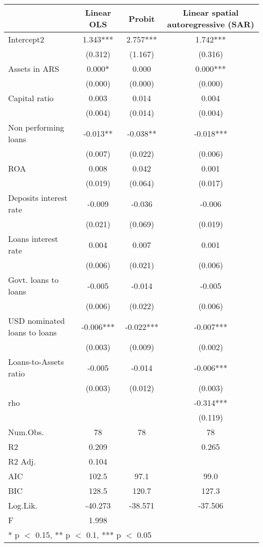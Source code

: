 \begin{table}
\centering
\begin{tabular}[t]{lccc}
\toprule
                             & Linear OLS & Probit & Linear spatial autoregressive (SAR)\\
\midrule
Intercept2                   & 1.343*** & 2.757*** & 1.742***\\
                             & (0.312) & (1.167) & (0.316)\\
Assets in ARS                & 0.000* & 0.000 & 0.000***\\
                             & (0.000) & (0.000) & (0.000)\\
Capital ratio                & 0.003 & 0.014 & 0.004\\
                             & (0.004) & (0.014) & (0.004)\\
Non performing loans         & -0.013** & -0.038** & -0.018***\\
                             & (0.007) & (0.022) & (0.006)\\
ROA                          & 0.008 & 0.042 & 0.001\\
                             & (0.019) & (0.064) & (0.017)\\
Deposits interest rate       & -0.009 & -0.036 & -0.006\\
                             & (0.021) & (0.069) & (0.019)\\
Loans interest rate          & 0.004 & 0.007 & 0.001\\
                             & (0.006) & (0.021) & (0.006)\\
Govt. loans to loans         & -0.005 & -0.014 & -0.005\\
                             & (0.006) & (0.022) & (0.006)\\
USD nominated loans to loans & -0.006*** & -0.022*** & -0.007***\\
                             & (0.003) & (0.009) & (0.002)\\
Loans-to-Assets ratio        & -0.005 & -0.014 & -0.006***\\
                             & (0.003) & (0.012) & (0.003)\\
rho                          &  &  & -0.314***\\
                             &  &  & (0.119)\\
\midrule
Num.Obs.                     & 78 & 78 & 78\\
R2                           & 0.209 &  & 0.265\\
R2 Adj.                      & 0.104 &  & \\
AIC                          & 102.5 & 97.1 & 99.0\\
BIC                          & 128.5 & 120.7 & 127.3\\
Log.Lik.                     & -40.273 & -38.571 & -37.506\\
F                            & 1.998 &  & \\
\bottomrule
\multicolumn{4}{l}{\rule{0pt}{1em}* p $<$ 0.15, ** p $<$ 0.1, *** p $<$ 0.05}\\
\end{tabular}
\end{table}
